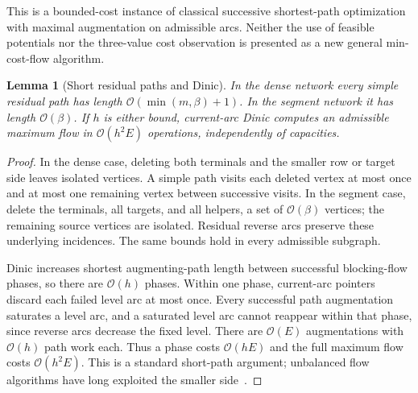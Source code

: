\documentclass[11pt]{article}
\newtheorem{lemma}[theorem]{Lemma}
\theoremstyle{remark}
\newcommand{\Oh}{\mathcal O}
\begin{document}
This is a bounded-cost instance of classical successive shortest-path optimization with maximal augmentation on admissible arcs. Neither the use of feasible potentials nor the three-value cost observation is presented as a new general min-cost-flow algorithm.

\begin{lemma}[Short residual paths and Dinic]\label{lem:paths}
In the dense network every simple residual path has length $\Oh(\min(m,\beta)+1)$. In the segment network it has length $\Oh(\beta)$. If $h$ is either bound, current-arc Dinic computes an admissible maximum flow in $\Oh(h^2E)$ operations, independently of capacities.
\end{lemma}
\begin{proof}
In the dense case, deleting both terminals and the smaller row or target side leaves isolated vertices. A simple path visits each deleted vertex at most once and at most one remaining vertex between successive visits. In the segment case, delete the terminals, all targets, and all helpers, a set of $\Oh(\beta)$ vertices; the remaining source vertices are isolated. Residual reverse arcs preserve these underlying incidences. The same bounds hold in every admissible subgraph.

Dinic increases shortest augmenting-path length between successful blocking-flow phases, so there are $\Oh(h)$ phases. Within one phase, current-arc pointers discard each failed level arc at most once. Every successful path augmentation saturates a level arc, and a saturated level arc cannot reappear within that phase, since reverse arcs decrease the fixed level. There are $\Oh(E)$ augmentations with $\Oh(h)$ path work each. Thus a phase costs $\Oh(hE)$ and the full maximum flow costs $\Oh(h^2E)$. This is a standard short-path argument; unbalanced flow algorithms have long exploited the smaller side~\cite{aost}.
\end{proof}
\end{document}
